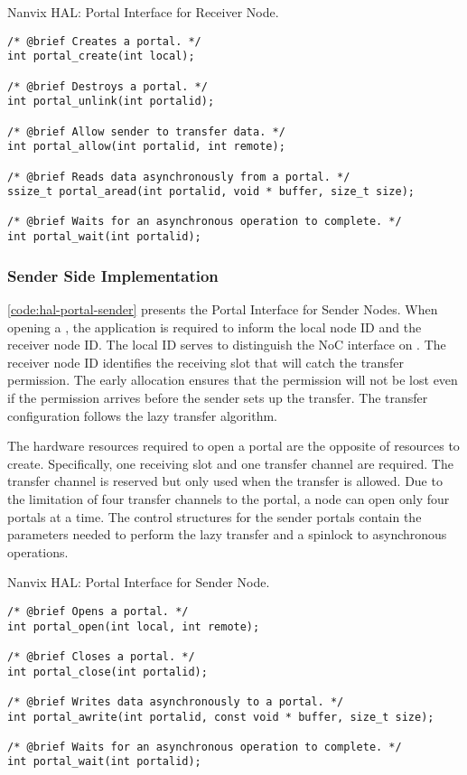 \begin{listing}[!tb]
\caption{Nanvix HAL: Portal Interface for Receiver Node.}
\label{code:hal-portal-receiver}
\begin{verbatim}
/* @brief Creates a portal. */
int portal_create(int local);

/* @brief Destroys a portal. */
int portal_unlink(int portalid);

/* @brief Allow sender to transfer data. */
int portal_allow(int portalid, int remote);

/* @brief Reads data asynchronously from a portal. */
ssize_t portal_aread(int portalid, void * buffer, size_t size);

/* @brief Waits for an asynchronous operation to complete. */
int portal_wait(int portalid);
\end{verbatim}
\end{listing}

			\subsubsection{Sender Side Implementation}

				\autoref{code:hal-portal-sender} presents the Portal Interface for
				Sender Nodes. When opening a \portal, the application is required to
				inform the local node ID and the receiver node ID. The local ID serves
				to distinguish the NoC interface on \ioclusters. The receiver node ID
				identifies the \cnoc receiving slot that will catch the transfer
				permission. The early allocation ensures that the permission will not
				be lost even if the permission arrives before the sender sets up the
				transfer. The transfer configuration follows the lazy transfer algorithm.

				The hardware resources required to open a portal are the opposite of
				resources to create. Specifically, one \cnoc receiving slot and one
				\dnoc transfer channel are required. The transfer channel is reserved
				but only used when the transfer is allowed. Due to the limitation of
				four transfer channels to the portal, a node can open only four portals
				at a time. The control structures for the sender portals contain the
				parameters needed to perform the lazy transfer and a spinlock to
				asynchronous operations.

\begin{listing}[!tb]
\caption{Nanvix HAL: Portal Interface for Sender Node.}
\label{code:hal-portal-sender}
\begin{verbatim}
/* @brief Opens a portal. */
int portal_open(int local, int remote);

/* @brief Closes a portal. */
int portal_close(int portalid);

/* @brief Writes data asynchronously to a portal. */
int portal_awrite(int portalid, const void * buffer, size_t size);

/* @brief Waits for an asynchronous operation to complete. */
int portal_wait(int portalid);
\end{verbatim}
\end{listing}

